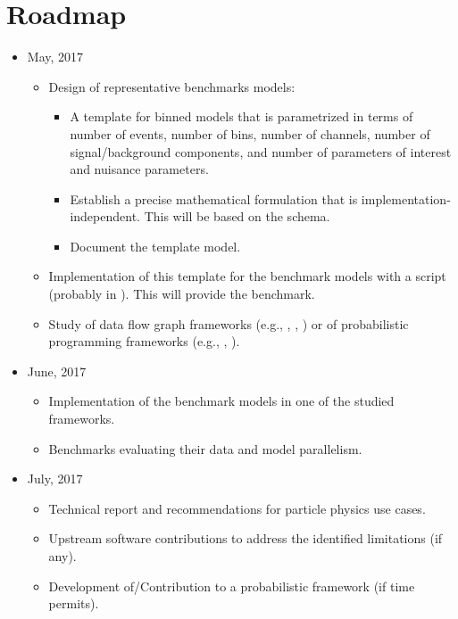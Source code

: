 \section{Roadmap}

\begin{itemize}
	\item May, 2017
	      \begin{itemize}
	      	\item Design of representative benchmarks models:
	      	      \begin{itemize}
	      	      	\item A template for binned models that is parametrized in terms of number of events, number of bins, number of channels, number of signal/background components, and number of parameters of interest and nuisance parameters.
	      	      	\item Establish a precise mathematical formulation that is implementation-independent.
	      	      	      This will be based on the  schema.
	      	      	\item Document the template model.
	      	      \end{itemize}
	      	\item Implementation of this template for the benchmark models with a  script (probably in ).
	      	      This will provide the  benchmark.
	      	\item Study of data flow graph frameworks (e.g., , , ) or of probabilistic programming frameworks (e.g., , ).
	      \end{itemize}
	\item June, 2017
	      \begin{itemize}
	      	\item Implementation of the benchmark models in one of the studied frameworks.
	      	\item Benchmarks evaluating their data and model parallelism.
	      \end{itemize}
	\item July, 2017
	      \begin{itemize}
	      	\item Technical report and recommendations for particle physics use cases.
	      	\item Upstream software contributions to address the identified limitations (if any).
	      	\item Development of/Contribution to a probabilistic framework (if time permits).
	      \end{itemize}
\end{itemize}
